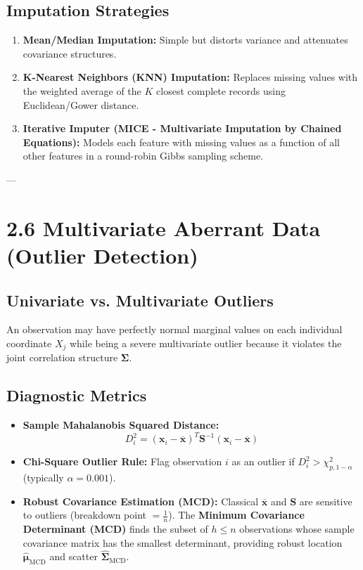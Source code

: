 \documentclass[
]{article}
\begin{document}
\subsection{Imputation Strategies}

\begin{enumerate}
\item
  \textbf{Mean/Median Imputation:} Simple but distorts variance and
  attenuates covariance structures.
\item
  \textbf{K-Nearest Neighbors (KNN) Imputation:} Replaces missing values
  with the weighted average of the \(K\) closest complete records using
  Euclidean/Gower distance.
\item
  \textbf{Iterative Imputer (MICE - Multivariate Imputation by Chained
  Equations):} Models each feature with missing values as a function of
  all other features in a round-robin Gibbs sampling scheme.
\end{enumerate}

---

\textbf{ }

\section{2.6 Multivariate Aberrant Data (Outlier Detection)}

\textbf{ }

\subsection{Univariate vs. Multivariate Outliers}

An observation may have perfectly normal marginal values on each
individual coordinate \(X_{j}\) while being a severe multivariate
outlier because it violates the joint correlation structure
\(\mathbf{\Sigma}\).

\textbf{ }

\subsection{Diagnostic Metrics}

\begin{itemize}
\item
  \textbf{Sample Mahalanobis Squared Distance:}
  \[D_{i}^{2} = \left( \mathbf{x}_{i} - \overline{\mathbf{x}} \right)^{T}\mathbf{S}^{- 1}\left( \mathbf{x}_{i} - \overline{\mathbf{x}} \right)\]
\item
  \textbf{Chi-Square Outlier Rule:} Flag observation \(i\) as an outlier
  if \(D_{i}^{2} > \chi_{p,1 - \alpha}^{2}\) (typically
  \(\alpha = 0.001\)).
\item
  \textbf{Robust Covariance Estimation (MCD):} Classical
  \(\overline{\mathbf{x}}\) and \(\mathbf{S}\) are sensitive to outliers
  (breakdown point \(= \frac{1}{n}\)). The \textbf{Minimum Covariance
  Determinant (MCD)} finds the subset of \(h \leq n\) observations whose
  sample covariance matrix has the smallest determinant, providing
  robust location \({\hat{\mathbf{\mu}}}_{\text{MCD}}\) and scatter
  \({\hat{\mathbf{\Sigma}}}_{\text{MCD}}\).
\end{itemize}
\end{document}
